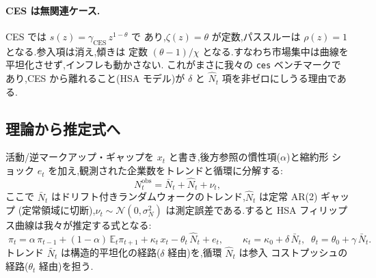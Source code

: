 \documentclass[11pt]{article}
\newcommand{\code}[1]{\texttt{#1}}
\newcommand{\kt}{\kappa_t}
\begin{document}
\paragraph{CES は無関連ケース.} CES では $s(z)=\gamma_{\mathrm{CES}}\,z^{1-\theta}$ で
あり,$\zeta(z)=\theta$ が定数,パススルーは $\rho(z)=1$ となる.参入項は消え,傾きは
定数 $(\theta-1)/\chi$ となる.すなわち市場集中は曲線を平坦化させず,インフレも動かさない.
これがまさに我々の \code{ces} ベンチマークであり,CES から離れること(HSA モデル)が
$\delta$ と $\hat N_t$ 項を非ゼロにしうる理由である.

\subsection{理論から推定式へ}
活動/逆マークアップ・ギャップを $x_t$ と書き,後方参照の慣性項($\alpha$)と縮約形
ショック $e_t$ を加え,観測された企業数をトレンドと循環に分解する:
\begin{equation}
N^{\mathrm{obs}}_t=\bar N_t+\hat N_t+\nu_t,
\end{equation}
ここで $\bar N_t$ はドリフト付きランダムウォークのトレンド,$\hat N_t$ は定常 AR(2) ギャップ
(定常領域に切断),$\nu_t\sim\mathcal N(0,\sigma_N^2)$ は測定誤差である.すると HSA
フィリップス曲線は我々が推定する式となる:
\begin{equation}
\boxed{\;\pi_t=\alpha\,\pi_{t-1}+(1-\alpha)\,\mathbb E_t\pi_{t+1}
+\kt\,x_t-\theta_t\,\hat N_t+e_t,\qquad
\kt=\kappa_0+\delta\,\bar N_t,\;\;\theta_t=\theta_0+\gamma\,\bar N_t.\;}
\label{eq:est}
\end{equation}
トレンド $\bar N_t$ は構造的平坦化の経路($\delta$ 経由)を,循環 $\hat N_t$ は参入
コストプッシュの経路($\theta_t$ 経由)を担う.
\end{document}
